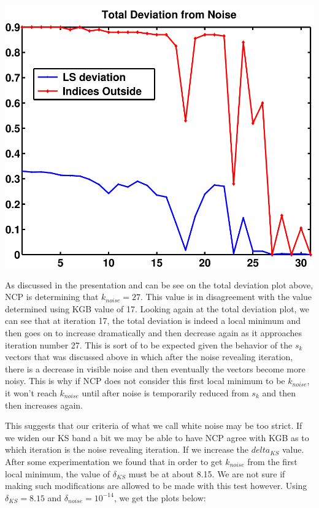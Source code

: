 \documentclass[11pt]{amsart}
\begin{document}
	\begin{minipage}[t]{0.5\textwidth}
	
		\includegraphics[width=.95\linewidth]{../presentation/figures/run1/total_deviation} 
   
	\end{minipage}
    \vspace{5mm}


As discussed in the presentation and can be see on the total deviation plot above, NCP
is determining that $k_{noise} = 27$. This value is in disagreement with the value determined
using KGB value of 17. Looking again at the total deviation plot, we can see that at iteration 17,
the total deviation is indeed a local minimum and then goes on to increase dramatically and then 
decrease again as it approaches iteration number 27. This is sort of to be expected given the
behavior of the $s_k$ vectors that was discussed above in which after the noise revealing
iteration, there is a decrease in visible noise and then eventually the vectors become more noisy. 
This is why if NCP does not consider this first local minimum to be $k_{noise}$, it won't
reach $k_{noise}$ until after noise is temporarily reduced from $s_k$ and then then increases
again.

This suggests that our criteria of what we call white noise may be too strict. If we widen our KS band
a bit we may be able to have NCP agree with KGB as to which iteration is the noise revealing iteration.
If we increase the $delta_{KS}$ value. After some experimentation we found that in order to get 
$k_{noise}$ from the first local minimum, the value of $\delta_{KS}$ must be at about 8.15.
We are not sure if making such modifications are allowed to be made with this test however.
Using $\delta_{KS}=8.15$ and $\delta_{noise}=10^{-14}$, we get the plots below:
\end{document}
